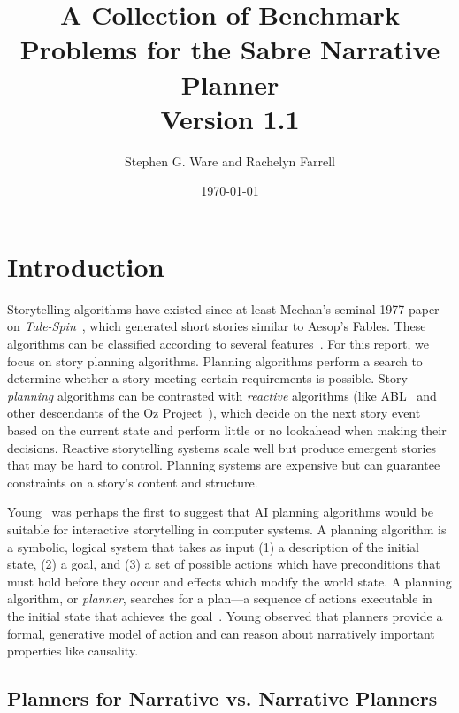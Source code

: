 \documentclass{nilreport}
\title{A Collection of Benchmark Problems for the Sabre Narrative Planner\\Version 1.1}
\author{Stephen G. Ware and Rachelyn Farrell}
\date{\today}
\begin{document}
\maketitle

\tableofcontents

\newpage


\section{Introduction}

Storytelling algorithms have existed since at least Meehan's seminal
1977 paper on \emph{Tale-Spin}~\cite{meehan1977tale}, which generated
short stories similar to Aesop's Fables. These algorithms can be classified
according to several features~\cite{kybartas2016survey}. For this
report, we focus on story planning algorithms. Planning algorithms
perform a search to determine whether a story meeting certain requirements
is possible. Story \emph{planning} algorithms can be contrasted with
\emph{reactive} algorithms (like ABL~\cite{mateas2004behavior} and
other descendants of the Oz Project~\cite{mateas2001oz}), which
decide on the next story event based on the current state and perform
little or no lookahead when making their decisions. Reactive storytelling
systems scale well but produce emergent stories that may be hard to
control. Planning systems are expensive but can guarantee constraints
on a story's content and structure.

Young~\cite{young1999notes} was perhaps the first to suggest that
AI planning algorithms would be suitable for interactive storytelling
in computer systems. A planning algorithm is a symbolic, logical system
that takes as input (1) a description of the initial state, (2) a
goal, and (3) a set of possible actions which have preconditions that
must hold before they occur and effects which modify the world state.
A planning algorithm, or \emph{planner}, searches for a plan---a
sequence of actions executable in the initial state that achieves
the goal~\cite{weld1999recent}. Young observed that planners provide
a formal, generative model of action and can reason about narratively
important properties like causality.

\subsection{Planners for Narrative vs. Narrative Planners}
\end{document}
